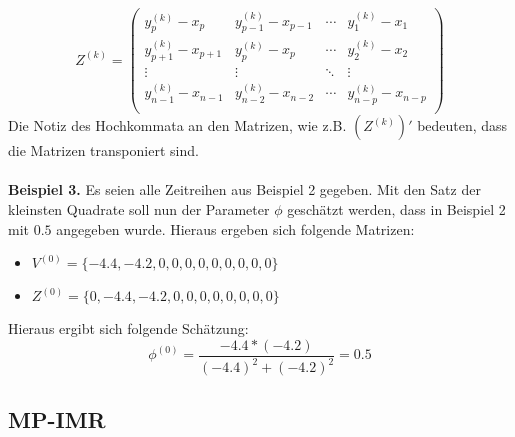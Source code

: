 ~\\
~\\
\[
    Z^{(k)} = \left(\begin{matrix}
        y_{p}^{(k)} - x_{p} & y_{p-1}^{(k)} - x_{p-1} & \cdots & y_{1}^{(k)} - x_{1}\\
        y_{p+1}^{(k)} - x_{p+1} & y_{p}^{(k)} - x_{p} & \cdots & y_{2}^{(k)} - x_{2}\\
        \vdots & \vdots & \ddots & \vdots \\
        y_{n-1}^{(k)} - x_{n-1} & y_{n-2}^{(k)} - x_{n-2} & \cdots & y_{n-p}^{(k)} - x_{n-p}\\
    \end{matrix}\right)
\]
Die Notiz des Hochkommata an den Matrizen, wie z.B. $\left(Z^{(k)}\right)'$ bedeuten, dass die Matrizen transponiert sind.
\\
\\
\textbf{Beispiel 3.} Es seien alle Zeitreihen aus Beispiel 2 gegeben. Mit den
Satz der kleinsten Quadrate soll nun der Parameter $\phi$ geschätzt werden,
dass in Beispiel 2 mit $0.5$ angegeben wurde. Hieraus ergeben sich folgende Matrizen:
\begin{itemize}
    \item $ V^{(0)}= \{-4.4, -4.2, 0, 0, 0, 0, 0, 0, 0, 0, 0\}$
    \item $Z^{(0)} = \{0, -4.4, -4.2, 0, 0, 0, 0, 0, 0, 0, 0\}$
\end{itemize}
Hieraus ergibt sich folgende Schätzung:
\[
    \phi^{(0)} = \frac{-4.4 * (-4.2)}{(-4.4)^2 + (-4.2)^2} = 0.5
\]


\subsection{MP-IMR}

